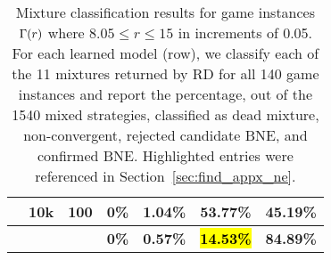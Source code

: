 \begin{table}[ht]
\begin{tabular}{c|c|c|c|c|c|c}
                               & 10k                       & 100                  & 0\%             & 1.04\%           & 53.77\%          & 45.19\%          \\
\hline
                               & \multicolumn{1}{l}{}      & \multicolumn{1}{l}{} & \textbf{0\%}    & \textbf{0.57\%}  & \hl{\textbf{14.53\%}} & \textbf{84.89\%}
\end{tabular}
\caption{Mixture classification results for game instances $\Gamma(r)$ where $8.05 \leq r \leq 15$ in increments of 0.05.
For each learned model (row), we classify each of the 11 mixtures returned by RD for all 140 game instances and report the percentage, out of the 1540 mixed strategies, classified as dead mixture, non-convergent, rejected candidate BNE, and confirmed BNE.
Highlighted entries were referenced in Section~\ref{sec:find_appx_ne}.}
\label{table:game1_mix_class_rgt8}
\end{table}